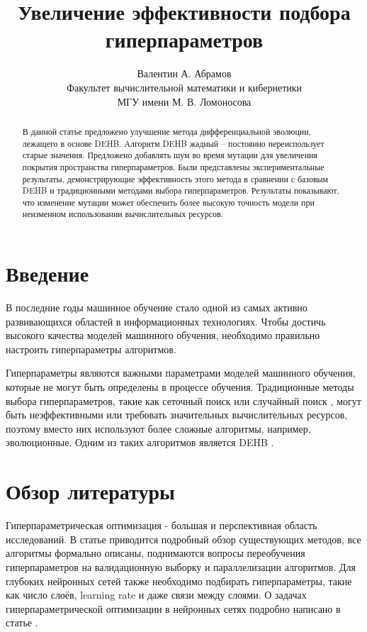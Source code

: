 \documentclass{article}
\title{Увеличение эффективности подбора гиперпараметров}
\author{ Валентин А. Абрамов \\
	Факультет вычислительной математики и кибернетики\\
	МГУ имени М. В. Ломоносова\\
}
\date{}
\begin{document}
\maketitle

\begin{abstract}
В данной статье предложено улучшение метода дифференциальной эволюции, лежащего в основе DEHB. Алгоритм DEHB жадный -- постоянно переиспользует старые значения. Предложено добавлять шум во время мутации для увеличения покрытия пространства гиперпараметров.
Были представлены экспериментальные результаты, демонстрирующие эффективность этого метода в сравнении с базовым DEHB и традиционными методами выбора гиперпараметров. Результаты показывают, что изменение мутации может обеспечить более высокую точность модели при неизменном использовании вычислительных ресурсов.

\end{abstract}


\section{Введение}


В последние годы машинное обучение стало одной из самых активно развивающихся областей в информационных технологиях. Чтобы достичь высокого качества моделей машинного обучения, необходимо правильно настроить гиперпараметры алгоритмов.

Гиперпараметры являются важными параметрами моделей машинного обучения, которые не могут быть определены в процессе обучения. Традиционные методы выбора гиперпараметров, такие как сеточный поиск \cite{grid_search} или случайный поиск \cite{random_search}, могут быть неэффективными или требовать значительных вычислительных ресурсов, поэтому вместо них используют более сложные алгоритмы, например, эволюционные. Одним из таких алгоритмов является DEHB \cite{awad2021dehb}.


\section{Обзор литературы}
Гиперпараметрическая оптимизация - большая и перспективная область исследований. В статье \cite{bischl2021hyperparameter} приводится подробный обзор существующих методов, все алгоритмы формально описаны, поднимаются вопросы переобучения гиперпараметров на валидационную выборку и параллелизации алгоритмов. Для глубоких нейронных сетей также необходимо подбирать гиперпараметры, такие как число слоёв, learning rate и даже связи между слоями. О задачах гиперпараметрической оптимизации в нейронных сетях подробно написано в статье \cite{Talbi2020OptimizationOD}.
\end{document}
